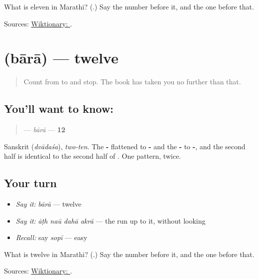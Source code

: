 \begin{tcolorbox}[breakable,colback=teal!4,colframe=teal!35!black,title={Before you move on}]
What is eleven in Marathi? (\textbf{}.) Say the number before it, and the one before that.

Sources: \href{https://en.wiktionary.org/wiki/\%E0\%A4\%85\%E0\%A4\%95\%E0\%A4\%B0\%E0\%A4\%BE}{Wiktionary: }.
\end{tcolorbox}
\section[\texorpdfstring{\mr{बारा} (bārā)}{बारा (bārā)}]{ (bārā) — twelve}

\label{lesson:MR-C56-bara}



\begin{quote}
Count from \textbf{} to \textbf{} and stop. The book has taken you no further than that.
\end{quote}

\subsection*{You'll want to know: }
\begin{quote}
\textbf{} — \emph{bārā} — \textbf{12}
\end{quote}

Sanskrit \textbf{} (\emph{dvādaśa}), \emph{two-ten}. The \textbf{-} flattened to \textbf{-} and the \textbf{-} to \textbf{-}, and the second half is identical to the second half of \textbf{}. One pattern, twice.

\subsection*{Your turn}
\begin{itemize}
\raggedright
  \item \emph{Say it:} \emph{bārā} — twelve
  \item \emph{Say it:} \emph{āṭh naū dahā akrā} — the run up to it, without looking
  \item \emph{Recall:} say \emph{sopī} — easy
\end{itemize}

\begin{tcolorbox}[breakable,colback=teal!4,colframe=teal!35!black,title={Before you move on}]
What is twelve in Marathi? (\textbf{}.) Say the number before it, and the one before that.

Sources: \href{https://en.wiktionary.org/wiki/\%E0\%A4\%AC\%E0\%A4\%BE\%E0\%A4\%B0\%E0\%A4\%BE}{Wiktionary: }.
\end{tcolorbox}

